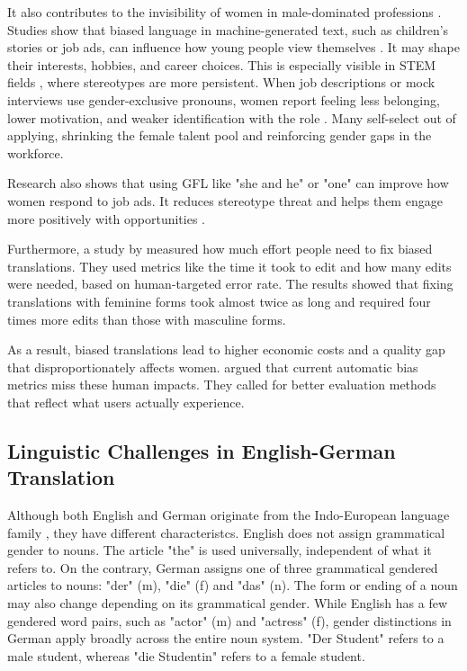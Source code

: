         It also contributes to the invisibility of women in male-dominated professions \parencite{kapplAreAllSpanish2025}. Studies show that biased language in machine-generated text, such as children’s stories or job ads, can influence how young people view themselves \parencite{soundararajanInvestigatingGenderBias2024,kapplAreAllSpanish2025}. It may shape their interests, hobbies, and career choices. This is especially visible in STEM fields \parencite{pratesAssessingGenderBias2019}, where stereotypes are more persistent. When job descriptions or mock interviews use gender-exclusive pronouns, women report feeling less belonging, lower motivation, and weaker identification with the role \parencite{godsilEffectsGenderRoles2016}. Many self-select out of applying, shrinking the female talent pool and reinforcing gender gaps in the workforce.

        Research also shows that using GFL like "she and he" or "one" can improve how women respond to job ads. It reduces stereotype threat and helps them engage more positively with opportunities \parencite{godsilEffectsGenderRoles2016}.

        Furthermore, a study by \textcite{savoldiWhatHarmQuantifying2024} measured how much effort people need to fix biased translations. They used metrics like the time it took to edit and how many edits were needed, based on human-targeted error rate. The results showed that fixing translations with feminine forms took almost twice as long and required four times more edits than those with masculine forms.

        As a result, biased translations lead to higher economic costs and a quality gap that disproportionately affects women. \citeauthor{savoldiWhatHarmQuantifying2024} argued that current automatic bias metrics miss these human impacts. They called for better evaluation methods that reflect what users actually experience.

    \subsection{Linguistic Challenges in English-German Translation}
        Although both English and German originate from the Indo-European language family \parencite{baldiEnglishIndoEuropeanLanguage2008}, they have different characteristcs. English does not assign grammatical gender to nouns. The article "the" is used universally, independent of what it refers to. On the contrary, German assigns one of three grammatical gendered articles to nouns: "der" (m), "die" (f) and "das" (n). The form or ending of a noun may also change depending on its grammatical gender. While English has a few gendered word pairs, such as "actor" (m) and "actress" (f), gender distinctions in German apply broadly across the entire noun system. "Der Student" refers to a male student, whereas "die Studentin" refers to a female student. 


